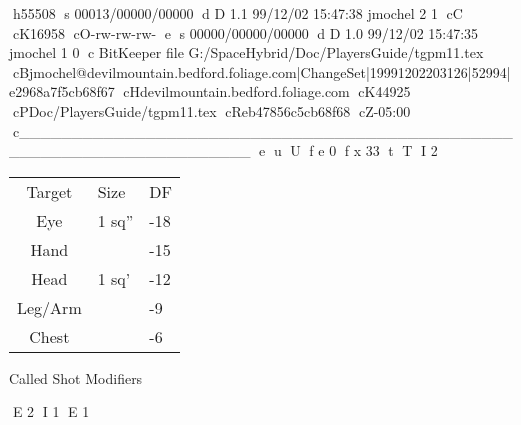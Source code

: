 h55508
s 00013/00000/00000
d D 1.1 99/12/02 15:47:38 jmochel 2 1
cC
cK16958
cO-rw-rw-rw-
e
s 00000/00000/00000
d D 1.0 99/12/02 15:47:35 jmochel 1 0
c BitKeeper file G:/SpaceHybrid/Doc/PlayersGuide/tgpm11.tex
cBjmochel@devilmountain.bedford.foliage.com|ChangeSet|19991202203126|52994|e2968a7f5cb68f67
cHdevilmountain.bedford.foliage.com
cK44925
cPDoc/PlayersGuide/tgpm11.tex
cReb47856c5cb68f68
cZ-05:00
c______________________________________________________________________
e
u
U
f e 0
f x 33
t
T
I 2
\begin{SHTable}
	\begin{tabular}{cll}
	Target	& Size & DF\\
	Eye		& 1 sq''& -18 \\
	Hand	&  		& -15 \\
	Head	& 1 sq' & -12 \\
	Leg/Arm & 		& -9 \\
	Chest	& 		& -6  \\
    \end{tabular}
    \caption{Called Shot Modifiers}
\end{SHTable}


E 2
I 1
E 1
